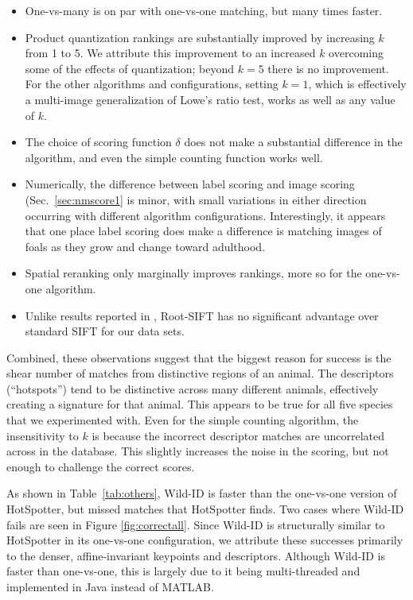 \begin{itemize}
\item One-vs-many is on par with one-vs-one matching, but many times
  faster.
\item Product quantization rankings are substantially improved by
  increasing $k$ from 1 to 5.  We attribute this improvement to
   an increased $k$ overcoming some of the
  effects of quantization; beyond $k=5$ there is no improvement.  For
  the other algorithms and configurations, setting $k=1$, which is
  effectively a multi-image generalization of Lowe's ratio test, works
  as well as any value of $k$.
\item The choice of scoring function $\delta$ does not make a
  substantial difference in the algorithm, and even the simple
  counting function works well.
\item Numerically, the difference between label scoring and image scoring
  (Sec.~\ref{sec:nmscore1} is minor, with small variations in either
  direction occurring with different algorithm configurations.
  Interestingly, it appears that one place label scoring does make a
  difference is matching images of foals as they grow and change
  toward adulthood.
\item Spatial reranking only marginally improves rankings, more so for
  the one-vs-one algorithm.
\item Unlike results reported in \cite{cvpr12ArandjelovicThreeThings},
  Root-SIFT has no significant advantage over standard SIFT for our
  data sets.
\end{itemize}
Combined, these observations suggest that the biggest reason for
success is the shear number of matches from distinctive regions of an animal.
The descriptors (``hotspots'') tend to be
distinctive across many different animals, effectively creating a
signature for that animal. This appears to be true for all five
species that we experimented with.  Even for the simple counting
algorithm, the insensitivity to $k$ is because the incorrect descriptor matches are
uncorrelated across in the database. This slightly increases the
noise in the scoring, but not enough to challenge the correct scores.

As shown in Table~\ref{tab:others}, Wild-ID is faster than the
one-vs-one version of HotSpotter, but missed matches that HotSpotter
finds. Two cases where Wild-ID fails are seen in Figure
\ref{fig:correctall}.  Since Wild-ID is structurally similar
to  HotSpotter in its one-vs-one configuration, we attribute these
successes primarily to the denser, affine-invariant keypoints
and descriptors. Although Wild-ID is faster than one-vs-one, this is largely due
to it being multi-threaded and implemented in Java instead of MATLAB.

